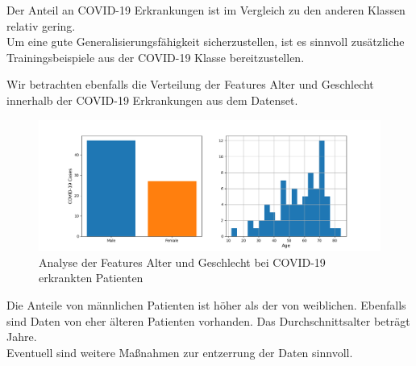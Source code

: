 Der Anteil an COVID-19 Erkrankungen ist im Vergleich zu den anderen Klassen relativ gering.\\
Um eine gute Generalisierungsfähigkeit sicherzustellen, ist es sinnvoll zusätzliche Trainingsbeispiele aus der COVID-19 Klasse bereitzustellen.

Wir betrachten ebenfalls die Verteilung der Features Alter und Geschlecht innerhalb der COVID-19 Erkrankungen aus dem Datenset.

\begin{figure}[ht]
	\centering
	\includegraphics[width=\textwidth]{../features_analysis.png}
	\caption{Analyse der Features Alter und Geschlecht bei COVID-19 erkrankten Patienten}
\end{figure}

Die Anteile von männlichen Patienten ist höher als der von weiblichen. Ebenfalls sind Daten von eher älteren Patienten vorhanden. Das Durchschnittsalter beträgt  Jahre.\\
Eventuell sind weitere Maßnahmen zur entzerrung der Daten sinnvoll.
